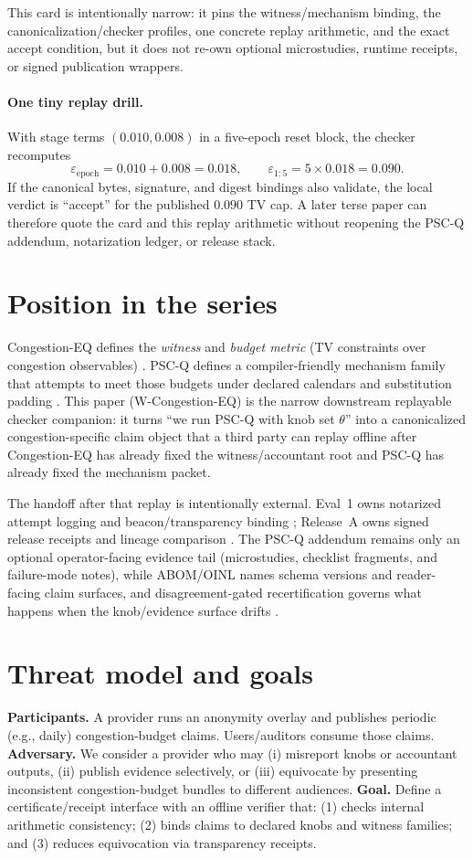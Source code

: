 \documentclass[11pt]{article}
\newcommand{\eps}{\varepsilon}
\begin{document}
This card is intentionally narrow: it pins the witness/mechanism binding, the canonicalization/checker profiles, one concrete replay arithmetic, and the exact accept condition, but it does not re-own optional microstudies, runtime receipts, or signed publication wrappers.

\paragraph{One tiny replay drill.}
With stage terms $(0.010,0.008)$ in a five-epoch reset block, the checker recomputes
\[
\eps_{\mathrm{epoch}} = 0.010+0.008 = 0.018,
\qquad
\eps_{1:5} = 5\times 0.018 = 0.090.
\]
If the canonical bytes, signature, and digest bindings also validate, the local verdict is ``accept'' for the published $0.090$ TV cap. A later terse paper can therefore quote the card and this replay arithmetic without reopening the PSC-Q addendum, notarization ledger, or release stack.

\section{Position in the series}
Congestion-EQ defines the \emph{witness} and \emph{budget metric} (TV constraints over congestion observables) \cite{series:congeq}.
PSC-Q defines a compiler-friendly mechanism family that attempts to meet those budgets under declared calendars and substitution padding \cite{series:pscq}.
This paper (W-Congestion-EQ) is the narrow downstream replayable checker companion: it turns ``we run PSC-Q with knob set $\theta$'' into a canonicalized congestion-specific claim object that a third party can replay offline after Congestion-EQ has already fixed the witness/accountant root and PSC-Q has already fixed the mechanism packet.

The handoff after that replay is intentionally external.
Eval~1 owns notarized attempt logging and beacon/transparency binding \cite{series:evalnotary}; Release~A owns signed release receipts and lineage comparison \cite{series:release}.
The PSC-Q addendum remains only an optional operator-facing evidence tail (microstudies, checklist fragments, and failure-mode notes), while ABOM/OINL names schema versions and reader-facing claim surfaces, and disagreement-gated recertification governs what happens when the knob/evidence surface drifts \cite{series:pscqaddendum,series:abom,series:recert}.

\section{Threat model and goals}
\textbf{Participants.}
A provider runs an anonymity overlay and publishes periodic (e.g., daily) congestion-budget claims.
Users/auditors consume those claims.
\textbf{Adversary.}
We consider a provider who may (i) misreport knobs or accountant outputs, (ii) publish evidence selectively, or (iii) equivocate by presenting inconsistent congestion-budget bundles to different audiences.
\textbf{Goal.}
Define a certificate/receipt interface with an offline verifier that:
(1) checks internal arithmetic consistency; (2) binds claims to declared knobs and witness families; and (3) reduces equivocation via transparency receipts.
\end{document}
